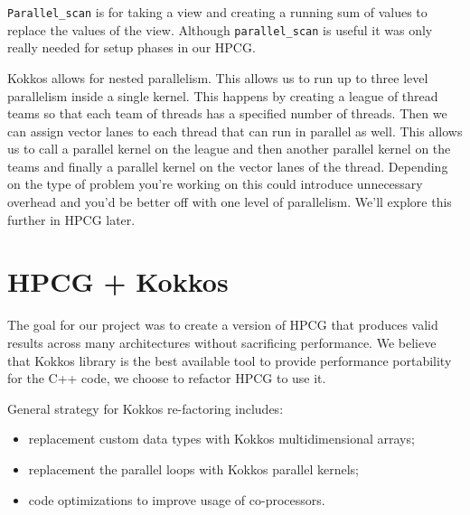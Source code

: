 \documentclass{ccr15}
\begin{document}
\texttt{Parallel\_scan} is for taking a view and creating a running sum of values
to replace the values of the view. Although \texttt{parallel\_scan} is useful it was only really needed
for setup phases in our HPCG.

Kokkos allows for nested parallelism. This allows us to run up to three level parallelism inside a single kernel. This
happens by creating a league of thread teams so that each team of threads has a specified number of threads.
Then we can assign vector lanes to each thread that can run in parallel as well. This allows us to call a parallel kernel on the 
league and then another parallel kernel on the teams and finally a parallel kernel on the vector lanes of the thread.
Depending on the type of problem you're working on this could introduce unnecessary overhead and you'd be better
off with one level of parallelism. We'll explore this further in HPCG later.



\section{HPCG + Kokkos}

The goal for our project was to create a version of HPCG that 
produces valid results across many architectures without sacrificing performance.
We believe that Kokkos library is the best available tool to provide performance portability for the C++ code, we choose to refactor HPCG to use it.

General strategy for Kokkos re-factoring includes: 
\begin{itemize}
\item replacement custom data types with Kokkos multidimensional arrays; 
\item replacement the parallel loops with Kokkos parallel kernels; 
\item code optimizations to improve usage of co-processors.
\end{itemize}
\end{document}
